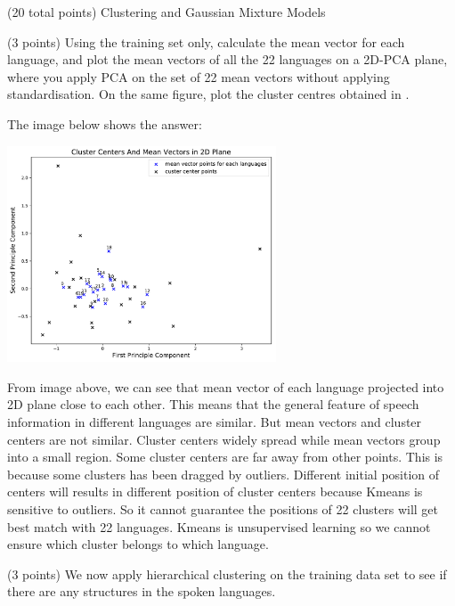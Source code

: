\documentclass[12pt]{article}
\begin{document}
\begin{question}{(20 total points) Clustering and Gaussian Mixture Models}
\begin{subquestion}
   \end{subquestion}
   \begin{subquestion}{(3 points)
       Using the training set only,
       calculate the mean vector for each language, and plot the mean
       vectors of all the 22 languages on a 2D-PCA plane, where you
       apply PCA on the set of 22 mean vectors without applying
       standardisation.  
       On the same figure, plot the cluster centres obtained in .
     } \label{Q3.2}

   

      \begin{answerbox}{35em}
         The image below shows the answer:
         \begin{center}
         \includegraphics[width=0.6\textwidth]{Cluster1.pdf}
         \end{center}
         From image above, we can see that mean vector of each language projected into 2D plane close to each other. This means that the general feature of speech information in different languages are similar. But mean vectors and cluster centers are not similar. Cluster centers widely spread while mean vectors group into a small region. Some cluster centers are far away from other points. This is because some clusters has been dragged by outliers. Different initial position of centers will results in different position of cluster centers because Kmeans is sensitive to outliers. So it cannot guarantee the positions of 22 clusters will get best match with 22 languages. Kmeans is unsupervised learning so we cannot ensure which cluster belongs to which language.
      \end{answerbox}
  


   \end{subquestion}
   \begin{subquestion}{(3 points)
       We now apply hierarchical clustering on the training data set
       to see if there are any structures in the spoken languages.
     } \label{Q3.3}



\end{subquestion}
\end{question}
\end{document}
